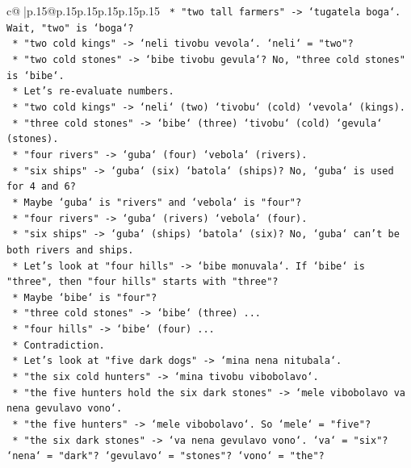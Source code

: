 \documentclass{article}
\begin{document}
{\begin{supertabular}{c@{$\;$}|p{.15\linewidth}@{}p{.15\linewidth}p{.15\linewidth}p{.15\linewidth}p{.15\linewidth}p{.15\linewidth}}
{{{\texttt{        *   "two tall farmers" {-}> `tugatela boga`. Wait, "two" is `boga`?} \\
\texttt{        *   "two cold kings" {-}> `neli tivobu vevola`. `neli` = "two"?} \\
\texttt{        *   "two cold stones" {-}> `bibe tivobu gevula`? No, "three cold stones" is `bibe`.} \\
\texttt{        *   Let's re{-}evaluate numbers.} \\
\texttt{        *   "two cold kings" {-}> `neli` (two) `tivobu` (cold) `vevola` (kings).} \\
\texttt{        *   "three cold stones" {-}> `bibe` (three) `tivobu` (cold) `gevula` (stones).} \\
\texttt{        *   "four rivers" {-}> `guba` (four) `vebola` (rivers).} \\
\texttt{        *   "six ships" {-}> `guba` (six) `batola` (ships)? No, `guba` is used for 4 and 6?} \\
\texttt{        *   Maybe `guba` is "rivers" and `vebola` is "four"?} \\
\texttt{        *   "four rivers" {-}> `guba` (rivers) `vebola` (four).} \\
\texttt{        *   "six ships" {-}> `guba` (ships) `batola` (six)? No, `guba` can't be both rivers and ships.} \\
\texttt{        *   Let's look at "four hills" {-}> `bibe monuvala`. If `bibe` is "three", then "four hills" starts with "three"?} \\
\texttt{        *   Maybe `bibe` is "four"?} \\
\texttt{        *   "three cold stones" {-}> `bibe` (three) ...} \\
\texttt{        *   "four hills" {-}> `bibe` (four) ...} \\
\texttt{        *   Contradiction.} \\
\texttt{        *   Let's look at "five dark dogs" {-}> `mina nena nitubala`.} \\
\texttt{        *   "the six cold hunters" {-}> `mina tivobu vibobolavo`.} \\
\texttt{        *   "the five hunters hold the six dark stones" {-}> `mele vibobolavo va nena gevulavo vono`.} \\
\texttt{        *   "the five hunters" {-}> `mele vibobolavo`. So `mele` = "five"?} \\
\texttt{        *   "the six dark stones" {-}> `va nena gevulavo vono`. `va` = "six"? `nena` = "dark"? `gevulavo` = "stones"? `vono` = "the"?} \\
}}}
\end{supertabular}}
\end{document}
